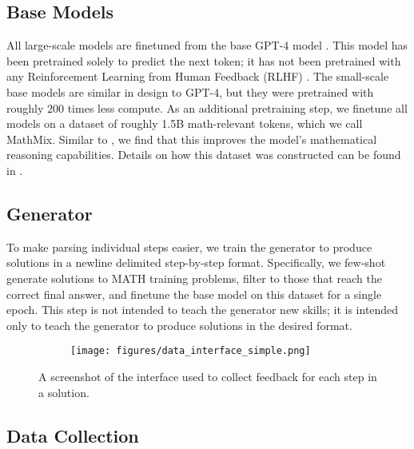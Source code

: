 \documentclass{article}
\begin{document}
\subsection{Base Models} \label{section:base_models}

All large-scale models are finetuned from the base GPT-4 model \citep{gpt4}. This model has been pretrained solely to predict the next token; it has not been pretrained with any Reinforcement Learning from Human Feedback (RLHF) \citep{christiano2017deep}. The small-scale base models are similar in design to GPT-4, but they were pretrained with roughly $200$ times less compute. As an additional pretraining step, we finetune all models on a dataset of roughly 1.5B math-relevant tokens, which we call MathMix. Similar to \cite{lewkowycz2022solving}, we find that this improves the model's mathematical reasoning capabilities. Details on how this dataset was constructed can be found in .

\subsection{Generator} \label{section:generator}

To make parsing individual steps easier, we train the generator to produce solutions in a newline delimited step-by-step format. Specifically, we few-shot generate solutions to MATH training problems, filter to those that reach the correct final answer, and finetune the base model on this dataset for a single epoch. This step is not intended to teach the generator new skills; it is intended only to teach the generator to produce solutions in the desired format. 

\begin{figure}
\centering
\begin{subfigure}{\textwidth}
\texttt{[image: figures/data\_interface\_simple.png]}
\end{subfigure}
\caption{A screenshot of the interface used to collect feedback for each step in a solution.}
\label{figure:data_interface}
\end{figure}

\subsection{Data Collection} \label{section:data_collection}
\end{document}

